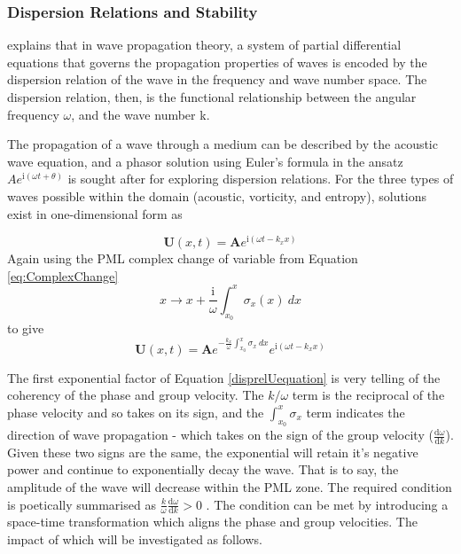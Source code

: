 \newpage
\subsubsection{Dispersion Relations and Stability} \label{DispRelaStabSection}

\textcite{whitham1974linearnonlinear} explains that in wave propagation theory, a system of partial differential equations that governs the propagation properties of waves is encoded by the dispersion relation of the wave in the frequency and wave number space. The dispersion relation, then, is the functional relationship between the angular frequency $\omega$, and the wave number k. 


The propagation of a wave through a medium can be described by the acoustic wave equation, and a phasor solution using Euler's formula in the ansatz $A e^{\mathrm{i}\left(\omega t + \theta \right)}$ is sought after for exploring dispersion relations. For the three types of waves possible within the domain (acoustic, vorticity, and entropy), solutions exist in one-dimensional form as

\begin{equation} \label{eq:OGAnsatz}
\mathbf{U}\left(x,t\right)=\mathbf{A}e^{\mathrm{i}\left(\omega t - k_x x \right)}
\end{equation}
Again using the PML complex change of variable from Equation \ref{eq:ComplexChange}
\begin{displaymath}
    x \rightarrow x + \frac{\mathrm{i}}{\omega} \int^{x}_{x_0} \sigma_{x} \left( x \right) \ dx
\end{displaymath}
to give
\begin{equation} \label{disprelUequation}
    \mathbf{U}\left(x,t\right) = \mathbf{A}e^{-\frac{k_x}{\omega} \int^{x}_{x_0} \sigma_{x} \ dx} e^{\mathrm{i} \left(\omega t - k_x x \right)}
\end{equation}
 
 
The first exponential factor of Equation \ref{disprelUequation} is very telling of the coherency of the phase and group velocity. The $k/\omega$ term is the reciprocal of the phase velocity and so takes on its sign, and the $\int^x_{x_0}\sigma_x$ term indicates the direction of wave propagation - which takes on the sign of the group velocity ($\frac{\mathrm{d}\omega}{\mathrm{d}k}$). Given these two signs are the same, the exponential will retain it's negative power and continue to exponentially decay the wave. That is to say, the amplitude of the wave will decrease within the PML zone. The required condition is poetically summarised as $\frac{k}{\omega}\frac{\mathrm{d}\omega}{\mathrm{d}k}>0$ \cite{hu2005aPML}. The condition can be met by introducing a space-time transformation which aligns the phase and group velocities. The impact of which will be investigated as follows.
 
